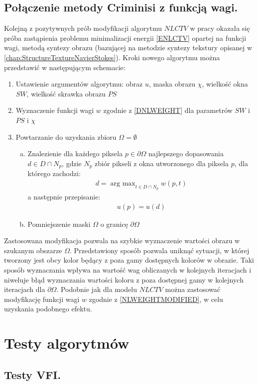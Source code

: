 \documentclass[12pt, twoside, openany]{report}
\theoremstyle{definition}
\begin{document}
\section{Połączenie metody Criminisi z funkcją wagi.}
Kolejną z pozytywnych prób modyfikacji algorytmu $NLCTV$ w pracy okazała się próba zastąpienia problemu minimalizacji energii \eqref{ENLCTV} opartej na funkcji wagi, metodą syntezy obrazu (bazującej na metodzie syntezy tekstury opisanej w \autoref{chap:StructureTextureNavierStokes}). Kroki nowego algorytmu można przedstawić w następującym schemacie:
\begin{enumerate}
\item
Ustawienie argumentów algorytmu: obraz $u$, maska obrazu $\chi$, wielkość okna $SW$, wielkość skrawka obrazu $PS$ 
\item
Wyznaczenie funkcji wagi $w$ zgodnie z \eqref{DNLWEIGHT} dla parametrów $SW$ i $PS$ i $\chi$
\item
Powtarzanie do uzyskania zbioru $\Omega = \emptyset$
\begin{enumerate}[a)]
\item
Znalezienie dla każdego piksela $p \in \partial\Omega$ najlepszego dopasowania $d \in D \cap N_p$, gdzie $N_p$ zbiór pikseli z okna utworzonego dla piksela $p$, dla którego zachodzi:
\begin{align}
d = \mathop{\mathrm{arg \ max}}_{t \in D \cap N_p} w(p,t)
\end{align}
a następnie przepisanie:
\begin{align}
u(p) = u(d)
\end{align}
\item
Pomniejszenie maski $\Omega$ o granicę $\partial\Omega$
\end{enumerate}
\end{enumerate}
Zastosowana modyfikacja pozwala na szybkie wyznaczenie wartości obrazu w szukanym obszarze $\Omega$. Przedstawiony sposób  pozwala uniknąć sytuacji, w której tworzony jest obcy kolor będący z poza gamy dostępnych kolorów w obrazie. Taki sposób wyznaczania wpływa na wartość wag obliczanych w kolejnych iteracjach i niweluje błąd wyznaczania wartości koloru z poza dostępnej gamy w kolejnych iteracjach dla $\partial \Omega$. Podobnie jak dla modelu $NLCTV$ można zastosować modyfikację funkcji wagi $w$ zgodnie z \eqref{NLWEIGHTMODIFIED}, w celu uzyskania podobnego efektu.
\chapter{Testy algorytmów}
\section{Testy VFI.}
\end{document}
